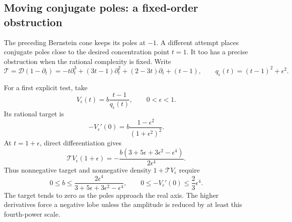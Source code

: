 \documentclass[11pt,a4paper]{article}
\theoremstyle{definition}
\theoremstyle{remark}
\numberwithin{equation}{section}
\begin{document}
\subsection{Moving conjugate poles: a fixed-order obstruction}
\label{p5:pk:moving-poles}
The preceding Bernstein cone keeps its poles at $-1$. A different attempt
places conjugate poles close to the desired concentration point $t=1$.
It too has a precise obstruction when the rational complexity is fixed.
Write
\[
 \mathcal T=\mathcal D(1-\partial_t)
 =-t\partial_t^3+(3t-1)\partial_t^2+(2-3t)\partial_t+(t-1),
 \qquad q_\epsilon(t)=(t-1)^2+\epsilon^2.
\]

For a first explicit test, take
\[
 V_\epsilon(t)=b\frac{t-1}{q_\epsilon(t)},\qquad 0<\epsilon<1.
\]
Its rational target is
\[
 -V_\epsilon'(0)
       =b\frac{1-\epsilon^2}{(1+\epsilon^2)^2}.
\]
At $t=1+\epsilon$, direct differentiation gives
\[
 \mathcal T V_\epsilon(1+\epsilon)
 =-\frac{b(3+5\epsilon+3\epsilon^2-\epsilon^4)}{2\epsilon^4}.
\]
Thus nonnegative target and nonnegative density $1+\mathcal T V_\epsilon$
require
\[
 0\le b\le\frac{2\epsilon^4}{3+5\epsilon+3\epsilon^2-\epsilon^4},
 \qquad 0\le -V_\epsilon'(0)\le\frac23\epsilon^4.
\]
The target tends to zero as the poles approach the real axis. The
higher derivatives force a negative lobe unless the amplitude is reduced
by at least this fourth-power scale.
\end{document}
